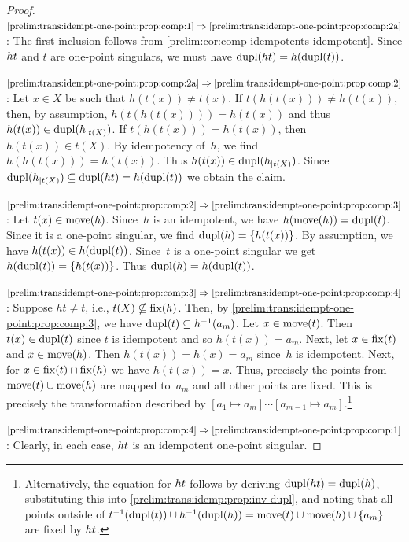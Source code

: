 \begin{proof}
$\ref{prelim:trans:idempt-one-point:prop:comp:1} \Rightarrow \ref{prelim:trans:idempt-one-point:prop:comp:2a}$:
 The first inclusion follows from \cref{prelim:cor:comp-idempotents-idempotent}.
 Since $\concat{t}{h}$ and $t$ are one-point singulars, we must have $\dupl{\concat{t}{h}} = h(\dupl{t})$.
 	
$\ref{prelim:trans:idempt-one-point:prop:comp:2a} \Rightarrow \ref{prelim:trans:idempt-one-point:prop:comp:2}$: 
Let $x \in X$ be such that $h(t(x)) \ne t(x)$.
If $t(h(t(x))) \ne h(t(x))$, then, by assumption, $h(t(h(t(x)))) = h(t(x))$
and thus $h(t(x)) \in \dupl{h_{|t(X)}}$.
If $t(h(t(x))) = h(t(x))$, then $h(t(x)) \in t(X)$.
By idempotency of~$h$, we find $h(h(t(x))) = h(t(x))$.
Thus $h(t(x)) \in \dupl{h_{|t(X)}}$.
Since $\dupl{h_{|t(X)}} \subseteq \dupl{\concat{t}{h}} = h(\dupl{t})$
we obtain the claim.
 
$\ref{prelim:trans:idempt-one-point:prop:comp:2} \Rightarrow \ref{prelim:trans:idempt-one-point:prop:comp:3}$: 
Let $t(x) \in \move{h}$.
Since~$h$ is an idempotent, we have $h(\move{h}) = \dupl{t}$. Since it is a one-point singular, we find 
$\dupl{h} = \{ h(t(x)) \}$.
By assumption, we have $h(t(x)) \in h(\dupl{t})$. Since~$t$ is a one-point singular
we get $h(\dupl{t}) = \{ h(t(x)) \}$.
Thus $\dupl{h} = h(\dupl{t})$.


$\ref{prelim:trans:idempt-one-point:prop:comp:3} \Rightarrow \ref{prelim:trans:idempt-one-point:prop:comp:4}$: 
Suppose $ht \ne t$, i.e., $t(X) \nsubseteq \fix{h}$.
Then, by \cref{prelim:trans:idempt-one-point:prop:comp:3}, we have $\dupl{t} \subseteq h^{-1}(a_m)$.
Let $x \in \move{t}$. Then $t(x) \in \dupl{t}$ since $t$ is idempotent
and so $h(t(x)) = a_m$.
Next, let $x \in \fix{t}$ and $x \in \move{h}$.
Then $h(t(x)) = h(x) = a_m$ since~$h$ is idempotent.
Next, for $x \in \fix{t}\cap \fix{h}$
we have $h(t(x)) = x$.
Thus, precisely the points from $\move{t} \cup \move{h}$ are mapped to~$a_m$
and all other points are fixed. This is precisely
the transformation described by $[a_1 \mapsto a_m] \cdots [a_{m-1} \mapsto a_m]$.\footnote{Alternatively, the equation for $\concat{t}{h}$ follows by deriving $\dupl{\concat{t}{h}} = \dupl{h}$,
	substituting this into \cref{prelim:trans:idemp:prop:inv-dupl},
	and noting that all points outside of $t^{-1}(\dupl{t}) \cup h^{-1}(\dupl{h}) = \move{t} \cup \move{h} \cup \{a_m\}$
	are fixed by $\concat{t}{h}$.}

$\ref{prelim:trans:idempt-one-point:prop:comp:4} \Rightarrow 
\ref{prelim:trans:idempt-one-point:prop:comp:1}$: Clearly, in each case,
$\concat{t}{h}$ is an idempotent one-point singular.
\end{proof}

